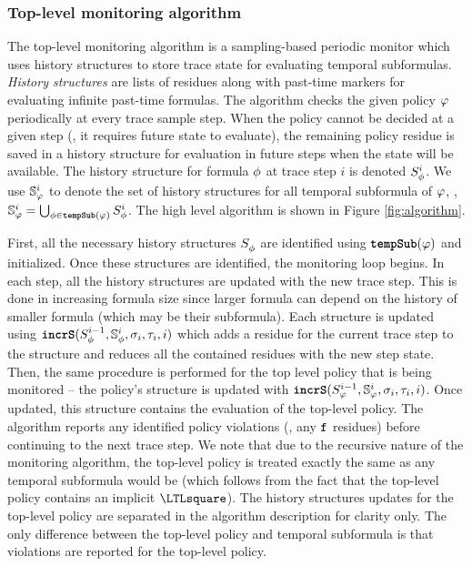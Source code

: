 \subsubsection{Top-level monitoring algorithm}
The top-level monitoring algorithm \monitor is a sampling-based periodic monitor which uses history structures to store trace state for evaluating temporal subformulas. 
\emph{History structures} are lists of residues along with past-time markers for evaluating infinite past-time formulas. 
The algorithm checks the given policy $\policy$ periodically at every trace sample step. 
When the policy cannot be decided at a given step (\eg, it requires future state to evaluate), the remaining policy residue is saved in a history structure for evaluation in future steps when the state will be available. 
The history structure for formula $\policyv$ at trace step $i$ is denoted $\histst[\policyv]{i}$. 
We use $\histSt[\policy]{i}$ to denote the set of history structures for all temporal subformula of $\policy$, \ie, 
$\histSt[\policy]{i} = \bigcup_{\policyv \in \tempSub(\policy)} \histst[\policyv]{i}$.
The high level algorithm \monitor is shown in Figure \ref{fig:algorithm}. 

First, all the necessary history structures $\histst[\policyv]{ }$ are identified using $\tempSub(\policy)$ and initialized. 
Once these structures are identified, the monitoring loop begins.
%
In each step, all the history structures are updated with the new trace step. 
This is done in increasing formula size since larger formula can depend on the history of smaller formula (which may be their subformula).
%
Each structure is updated using $\incrS(\histst[\policyv]{i-1},\histSt[\policyv]{i}, \sigma_i, \tau_i, i)$ which adds a residue for the current trace step to the structure and reduces all the contained residues with the new step state. 
Then, the same procedure is performed for the top level policy that is being monitored -- the policy's structure is updated with $\incrS(\histst{i-1},\histSt{i},\sigma_i,\tau_i, i)$.
Once updated, this structure contains the evaluation of the top-level policy. The algorithm reports any identified policy violations (\ie, any $\false$ residues) before continuing to the next trace step.
%
We note that due to the recursive nature of the monitoring algorithm, the top-level policy is treated exactly the same as any temporal subformula would be (which follows from the fact that the top-level policy contains an implicit $\henceforth$). 
The history structures updates for the top-level policy are separated in the algorithm description for clarity only.
The only difference between the top-level policy and temporal subformula is that violations are reported for the top-level policy. 

